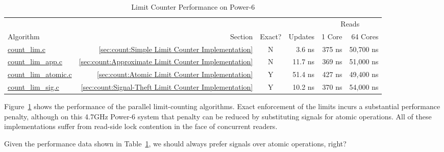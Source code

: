 \begin{table}
\begin{center}
\begin{tabular}{l|r|c|r|r|r}
	& & & & \multicolumn{2}{|c}{Reads} \\
	\cline{5-6}
	Algorithm & Section & Exact? & Updates & 1 Core & 64 Cores \\
	\hline
	\hline
	\url{count_lim.c} & \ref{sec:count:Simple Limit Counter Implementation} &
		N & 3.6 ns & 375 ns & 50,700 ns \\
	\url{count_lim_app.c} & \ref{sec:count:Approximate Limit Counter Implementation} &
		N & 11.7 ns & 369 ns & 51,000 ns \\
	\url{count_lim_atomic.c} & \ref{sec:count:Atomic Limit Counter Implementation} &
		Y & 51.4 ns & 427 ns & 49,400 ns \\
	\url{count_lim_sig.c} & \ref{sec:count:Signal-Theft Limit Counter Implementation} &
		Y & 10.2 ns & 370 ns & 54,000 ns \\
\end{tabular}
\end{center}
\caption{Limit Counter Performance on Power-6}
\label{tab:count:Limit Counter Performance on Power-6}
\end{table}

Figure~\ref{tab:count:Limit Counter Performance on Power-6}
shows the performance of the parallel limit-counting algorithms.
Exact enforcement of the limits incurs a substantial performance
penalty, although on this 4.7GHz Power-6 system that penalty can be reduced
by substituting signals for atomic operations.
All of these implementations suffer from read-side lock contention
in the face of concurrent readers.

\QuickQuiz{}
	Given the performance data shown in
	Table~\ref{tab:count:Limit Counter Performance on Power-6},
	we should always prefer signals over atomic operations, right?
 \QuickQuizEnd


